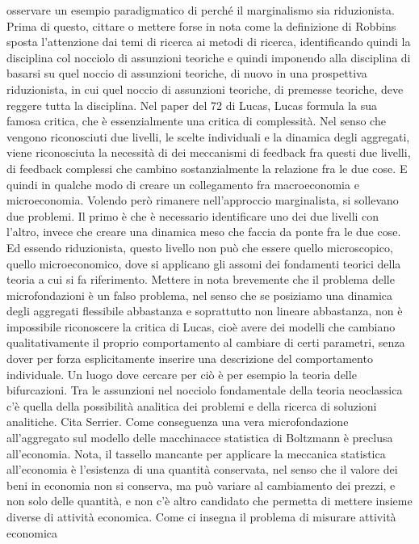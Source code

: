 \documentclass[a4paper, headings=standardclasses]{scrartcl}
\begin{document}
osservare un esempio paradigmatico di perché il marginalismo sia riduzionista. Prima di questo,
cittare o mettere forse in nota come la definizione di Robbins sposta l'attenzione
dai temi di ricerca ai metodi di ricerca, identificando quindi la disciplina col nocciolo
di assunzioni teoriche e quindi imponendo alla disciplina di basarsi su quel noccio
di assunzioni teoriche, di nuovo in una prospettiva riduzionista, in cui quel noccio di assunzioni
teoriche, di premesse teoriche, deve reggere tutta la disciplina. Nel paper del 72 di Lucas,
Lucas formula la sua famosa critica, che è essenzialmente una critica di complessità.
Nel senso che vengono riconosciuti due livelli, le scelte individuali e la dinamica degli aggregati,
viene riconosciuta la necessità di dei meccanismi di feedback fra questi due livelli,
di feedback complessi che cambino sostanzialmente la relazione fra le due cose.
E quindi in qualche modo di creare un collegamento fra macroeconomia e microeconomia.
Volendo però rimanere nell'approccio marginalista, si sollevano due problemi. Il primo è che è
necessario identificare uno dei due livelli con l'altro, invece che creare una dinamica meso che
faccia da ponte fra le due cose. Ed essendo riduzionista, questo livello non può che
essere quello microscopico, quello microeconomico, dove si applicano gli assomi dei fondamenti
teorici della teoria a cui si fa riferimento.
Mettere in nota brevemente che il problema delle microfondazioni è un falso problema,
nel senso che se posiziamo una dinamica degli aggregati flessibile abbastanza e soprattutto
non lineare abbastanza, non è impossibile riconoscere la critica di Lucas, cioè avere
dei modelli che cambiano qualitativamente il proprio comportamento al cambiare di certi
parametri, senza dover per forza esplicitamente inserire una descrizione del comportamento
individuale. Un luogo dove cercare per ciò è per esempio la teoria delle bifurcazioni.
Tra le assunzioni nel nocciolo fondamentale della teoria neoclassica c'è quella della
possibilità analitica dei problemi e della ricerca di soluzioni analitiche. Cita Serrier.
Come conseguenza una vera microfondazione all'aggregato sul modello delle macchinacce
statistica di Boltzmann è preclusa all'economia. Nota, il tassello mancante per applicare la
meccanica statistica all'economia è l'esistenza di una quantità conservata, nel senso che
il valore dei beni in economia non si conserva, ma può variare al cambiamento dei prezzi,
e non solo delle quantità, e non c'è altro candidato che permetta di mettere insieme
diverse di attività economica. Come ci insegna il problema di misurare attività economica
\end{document}
